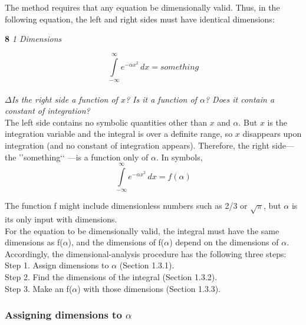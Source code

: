 \documentclass[a4paper]{article}
\begin{document}
The method requires that any equation be dimensionally valid. Thus,
in the following equation, the left and right sides must have identical
dimensions:

\newpage
 \large\textbf{8} \hfill \textit{1 Dimensions} \\ 
\vspace{0pt} 

\begin{equation}
\int\limits_{-\infty}^{\infty} e^{-\alpha x^2}\,dx=something
\end{equation}
\\

$\Delta$\textit {Is the right side a function of $x$? Is it a function of $\alpha$? Does it contain a constant
of integration?}
\\

The left side contains no symbolic quantities other than $x$ and $\alpha$. But
$x$ is the integration variable and the integral is over a definite range, so
$x$ disappears upon integration (and no constant of integration appears).
Therefore, the right side—the ’’something‘‘
—is a function only of $\alpha$. In
symbols,
\\

\begin{equation}
\int\limits_{-\infty}^{\infty} e^{-\alpha x^2}\,dx=f(\alpha)
\end{equation}

The function f might include dimensionless numbers such as 2/3 or $\sqrt{\pi}$,
but $\alpha$ is its only input with dimensions.
\\

For the equation to be dimensionally valid, the integral must have the
same dimensions as f($\alpha$), and the dimensions of f($\alpha$) depend on the
dimensions of $\alpha$. Accordingly, the dimensional-analysis procedure has
the following three steps:
\\

Step 1. Assign dimensions to $\alpha$ (Section 1.3.1).
\\

Step 2. Find the dimensions of the integral (Section 1.3.2).
\\

Step 3. Make an f($\alpha$) with those dimensions (Section 1.3.3).
\\

\subsubsection{Assigning dimensions to $\alpha$}
\end{document}
